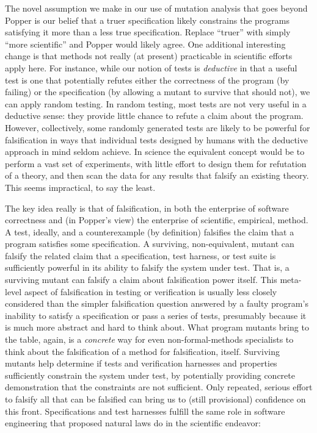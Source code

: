 \documentclass{svjour3}
\begin{document}
The novel assumption we make in our use of mutation analysis that goes
beyond Popper is our belief that a truer specification likely constrains
the programs satisfying it more than a less true specification.  Replace ``truer'' with
simply ``more scientific'' and Popper would likely agree.
One additional interesting change is that methods not really (at
present) practicable in scientific efforts apply here.  For instance,
while our notion of tests is \emph{deductive} in that a useful test is
one that potentially refutes either the correctness of the program (by
failing) or the specification (by allowing a mutant to survive that
should not), we can apply random testing.  In random testing, most
tests are not very useful in a deductive sense: they provide little
chance to refute a claim about the program.  However, collectively,
some randomly generated tests are likely to be powerful for
falsification in ways that individual tests designed by humans with
the deductive approach in mind seldom achieve.  In science the
equivalent concept would be to perform a vast set of experiments, with
little effort to design them for refutation of a theory, and then scan
the data for any results that falsify an existing theory.  This seems
impractical, to say the least.

The key idea really is that of falsification, in both the enterprise
of software correctness and (in Popper's view) the enterprise of
scientific, empirical, method.  A test, ideally, and a counterexample (by definition) falsifies the claim that a program satisfies some
specification.  A surviving, non-equivalent, mutant can falsify the
related claim that a specification, test harness, or test suite is
sufficiently powerful in its ability to falsify the system under
test.  That is, a surviving mutant can falsify a claim about
falsification power itself.  This meta-level aspect of falsification in testing or
verification is usually less closely considered than the simpler
falsification question answered by a faulty program's inability to satisfy a specification
or pass a series of tests, presumably because it is much more abstract
and hard to think about.  What program mutants bring to the table,
again, is a \emph{concrete} way for even non-formal-methods
specialists to think about the falsification of a method for
falsification, itself.  Surviving mutants help determine if tests and
verification harnesses and properties sufficiently constrain the
system under test, by potentially providing concrete demonstration
that the constraints are not sufficient.
Only
repeated, serious effort to falsify all that can be falsified can
bring us to (still provisional) confidence on this front.  Specifications and test
harnesses fulfill the same role in software engineering that proposed
natural laws do in the scientific endeavor:
\end{document}
